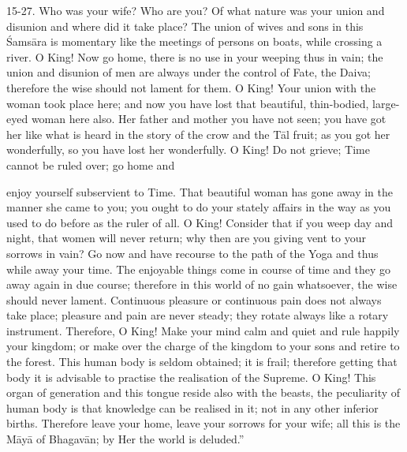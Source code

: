 15-27. Who was your wife? Who are you? Of what nature was your union and disunion and where did it take place? The union of wives and sons in this \'Sams\=ara is momentary like the meetings of persons on boats, while crossing a river. O King! Now go home, there is no use in your weeping thus in vain; the union and disunion of men are always under the control of Fate, the Daiva; therefore the wise should not lament for them. O King! Your union with the woman took place here; and now you have lost that beautiful, thin-bodied, large-eyed woman here also. Her father and mother you have not seen; you have got her like what is heard in the story of the crow and the T\=al fruit; as you got her wonderfully, so you have lost her wonderfully. O King! Do not grieve; Time cannot be ruled over; go home and

enjoy yourself subservient to Time. That beautiful woman has gone away in the manner she came to you; you ought to do your stately affairs in the way as you used to do before as the ruler of all. O King! Consider that if you weep day and night, that women will never return; why then are you giving vent to your sorrows in vain? Go now and have recourse to the path of the Yoga and thus while away your time. The enjoyable things come in course of time and they go away again in due course; therefore in this world of no gain whatsoever, the wise should never lament. Continuous pleasure or continuous pain does not always take place; pleasure and pain are never steady; they rotate always like a rotary instrument. Therefore, O King! Make your mind calm and quiet and rule happily your kingdom; or make over the charge of the kingdom to your sons and retire to the forest. This human body is seldom obtained; it is frail; therefore getting that body it is advisable to practise the realisation of the Supreme. O King! This organ of generation and this tongue reside also with the beasts, the peculiarity of human body is that knowledge can be realised in it; not in any other
inferior births. Therefore leave your home, leave your sorrows for your wife; all this is the M\=ay\=a of Bhagav\=an; by Her the world is deluded.''

